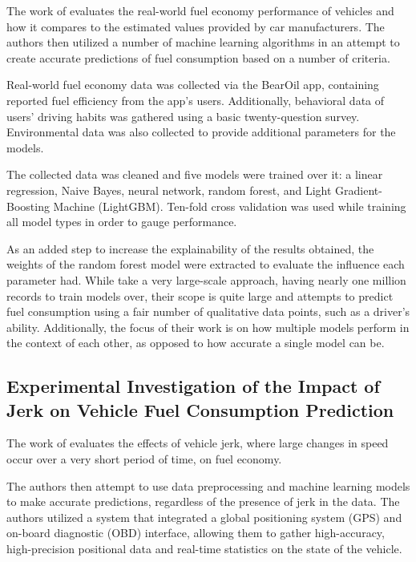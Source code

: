 \documentclass[letterpaper]{article}
\begin{document}
The work of \cite{yang2022predicting} evaluates the real-world fuel economy performance of vehicles 
and how it compares to the estimated values provided by car manufacturers. The authors then 
utilized a number of machine learning algorithms in an attempt to create accurate predictions 
of fuel consumption based on a number of criteria.

Real-world fuel economy data was collected via the BearOil app, containing reported fuel 
efficiency from the app’s users. Additionally, behavioral data of users’ driving habits was 
gathered using a basic twenty-question survey. Environmental data was also collected to provide 
additional parameters for the models.

The collected data was cleaned and five models were trained over it: a linear regression, Naive 
Bayes, neural network, random forest, and Light Gradient-Boosting Machine (LightGBM). 
Ten-fold cross validation was used while training all model types in order to gauge performance.

As an added step to increase the explainability of the results obtained, the weights of the 
random forest model were extracted to evaluate the influence each parameter had.
While \cite{yang2022predicting} take a very large-scale approach, having nearly one million 
records to train  models over, their scope is quite large and attempts to predict fuel 
consumption using a fair  number of qualitative data points, such as a driver’s ability. 
Additionally, the focus of their  work is on how multiple models perform in the context of 
each other, as opposed to how accurate a single model can be.

\subsection*{Experimental Investigation of the Impact of Jerk on Vehicle Fuel
Consumption Prediction}

The work of \cite{zhang2023novel} evaluates the effects of vehicle jerk, where large
changes in speed occur over a very short period of time, on fuel economy. 

The authors then attempt to use data preprocessing and machine learning models to
make accurate predictions, regardless of the presence of jerk in the data. The
authors utilized a system that integrated a global positioning system (GPS) and
on-board diagnostic (OBD) interface, allowing them to gather high-accuracy,
high-precision positional data and real-time statistics on the state of the
vehicle. 
\end{document}
